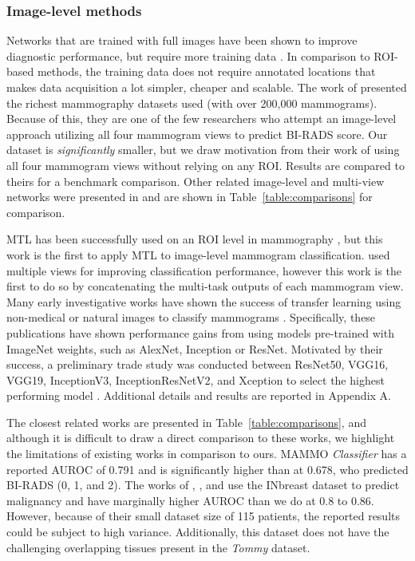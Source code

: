 \documentclass[journal]{IEEEtran}
\begin{document}
\subsubsection{Image-level methods}

Networks that are trained with full images have been shown to improve diagnostic performance, but require more training data \cite{end2end-2017}.  In comparison to ROI-based methods, the training data does not require annotated locations that makes data acquisition a lot simpler, cheaper and scalable.  The work of \cite{krysztof-etal-2017} presented the richest mammography datasets used (with over 200,000 mammograms).  Because of this, they are one of the few researchers who attempt an image-level approach utilizing all four mammogram views to predict BI-RADS score.  Our dataset is \textit{significantly} smaller, but we draw motivation from their work of using all four mammogram views without relying on any ROI.  Results are compared to theirs for a benchmark comparison.  Other related image-level and multi-view networks were presented in \cite{akselrod-2016, carneiro-2015, carneiro-2017, zhu-2016, bekker-2016} and are shown in Table~\ref{table:comparisons} for comparison.  

MTL has been successfully used on an ROI level in mammography \cite{kisilev-2016, multi-task2}, but this work is the first to apply MTL to image-level mammogram classification.  \cite{carneiro-2015, bekker-2016, krysztof-etal-2017, yi-2017}  used multiple views for improving classification performance, however this work is the first to do so by concatenating the multi-task outputs of each mammogram view.  Many early investigative works have shown the success of transfer learning using non-medical or natural images to classify mammograms  \cite{argyriou-2006}. Specifically, these publications have shown performance gains from using models pre-trained with ImageNet weights, such as AlexNet, Inception or ResNet\cite{huynh-2016,levy-2016, samala-2016a, jiang-2017, yi-2017}. Motivated by their success, a preliminary trade study was conducted between ResNet50, VGG16, VGG19, InceptionV3, InceptionResNetV2, and Xception to select the highest performing model \cite{resnet-2015, vgg-2014, inceptionv3-2015, inceptionresnet-2016, xception-2016}. Additional details and results are reported in Appendix A.  

The closest related works are presented in Table~\ref{table:comparisons}, and although it is difficult to draw a direct comparison to these works, we highlight the limitations of existing works in comparison to ours. MAMMO \textit{Classifier} has a reported AUROC of 0.791 and is significantly higher than \cite{krysztof-etal-2017} at 0.678, who predicted BI-RADS (0, 1, and 2).  The works of \cite{carneiro-2017}, \cite{dhungel-2015c}, and \cite{zhu-2016} use the INbreast dataset to predict malignancy and have marginally higher AUROC than we do at 0.8 to 0.86.  However, because of their small dataset size of 115 patients, the reported results could be subject to high variance.  Additionally, this dataset does not have the challenging overlapping tissues present in the \textit{Tommy} dataset.  
\end{document}
